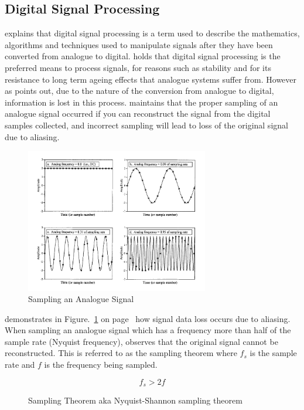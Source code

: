 \subsection*{Digital Signal Processing}
\cite{smith-03-a} explains that digital signal processing is a term used to describe the mathematics, algorithms and techniques used to manipulate signals after they have been converted from analogue to digital. \cite{freidt-13} holds that digital signal processing is the preferred means to process signals, for reasons such as stability and for its resistance to long term ageing effects that analogue systems suffer from. However as \cite{smith-03-b} points out, due to the nature of the conversion from analogue to digital, information is lost in this process. \cite{smith-03-b} maintains that the proper sampling of an analogue signal occurred if you can reconstruct the signal from the digital samples collected, and incorrect sampling will lead to loss of the original signal due to aliasing.

%
\begin{figure}[here]
\centering
\includegraphics[width=8cm]{images/44}
\caption{Sampling an Analogue Signal \citep{smith-03-b}}
\label{fig:smith_sample_theorem_2003}
\end{figure}
%

\cite{smith-03-b} demonstrates in Figure.~\ref{fig:smith_sample_theorem_2003} on page~\pageref{fig:smith_sample_theorem_2003} how signal data loss occurs due to aliasing. When sampling an analogue signal which has a frequency more than half of the sample rate (Nyquist frequency), \cite{smith-03-b} observes that the original signal cannot be reconstructed. This is referred to as the sampling theorem \citep{smith-03-b} where $f_s$ is the sample rate and $f$ is the frequency being sampled.

%
\begin{figure}[here]
  \centering
  \begin{equation}  	
    f_s > 2f
  \end{equation}
  \caption{Sampling Theorem aka Nyquist-Shannon sampling theorem \citep{smith-03-b}}
  \label{fig:nyquist-shannon-sample-theorem}
\end{figure}
%

